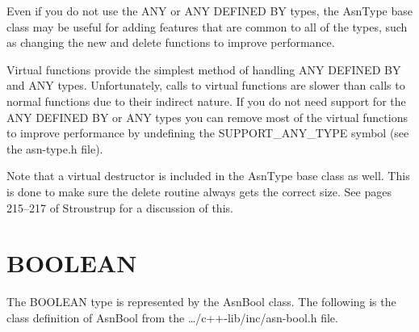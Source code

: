 Even if you do not use the ANY or ANY DEFINED BY types, the
{\C AsnType} base class may be useful for adding features that are
common to all of the types, such as changing the {\C new} and
{\C delete} functions to improve performance.

Virtual functions provide the simplest method of handling ANY DEFINED
BY and ANY types. Unfortunately, calls to virtual functions are slower
than calls to normal functions due to their indirect nature.  If you
do not need support for the ANY DEFINED BY or ANY types you can remove
most of the virtual functions to improve performance by undefining the
{\C SUPPORT\_ANY\_TYPE} symbol (see the
{\ufn asn-type.h} file).

Note that a virtual destructor is included in the {\C AsnType} base
class as well.  This is done to make sure the {\C delete} routine
always gets the correct size.  See pages 215--217 of Stroustrup
\cite{stroustrup} for a discussion of this.

\section{\label{bool-C++-section}BOOLEAN}

The BOOLEAN type is represented by the {\C AsnBool} class. The
following is the class definition of {\C AsnBool} from the
{\ufn \dots/c++-lib/inc/asn-bool.h} file.

